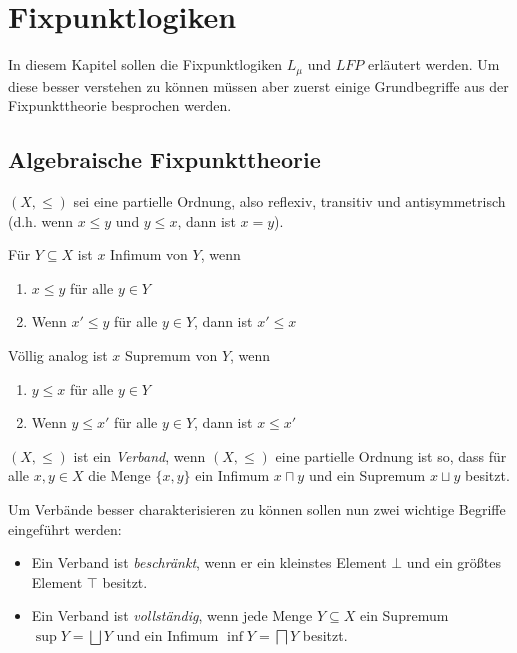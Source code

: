 \section{Fixpunktlogiken}

In diesem Kapitel sollen die Fixpunktlogiken $L_\mu$ und $LFP$ erläutert werden. 
Um diese besser verstehen zu können müssen aber zuerst einige Grundbegriffe aus der Fixpunkttheorie besprochen werden.

\subsection{Algebraische Fixpunkttheorie}

$(X,\leq)$ sei eine partielle Ordnung, also reflexiv, transitiv und antisymmetrisch (d.h. wenn $x\leq y$ und $y\leq x$, dann ist $x=y$).

Für $Y\subseteq X$ ist $x$ Infimum von $Y$, wenn
\begin{enumerate}
	\item $x\leq y$ für alle $y\in Y$
	\item Wenn $x'\leq y$ für alle $y\in Y$, dann ist $x'\leq x$
\end{enumerate}
Völlig analog ist $x$ Supremum von $Y$, wenn
\begin{enumerate}
	\item $y\leq x$ für alle $y\in Y$
	\item Wenn $y\leq x'$ für alle $y\in Y$, dann ist $x\leq x '$
\end{enumerate}

\begin{definition}[Verband]
	$(X,\leq)$ ist ein \textit{Verband}, wenn $(X,\leq)$ eine partielle Ordnung ist so, dass für alle $x,y\in X$ die Menge $\{x,y\}$ ein Infimum $x\sqcap y$ und ein Supremum $x\sqcup y$ besitzt.
\end{definition}

\begin{definition}
	Um Verbände besser charakterisieren zu können sollen nun zwei wichtige Begriffe eingeführt werden:
	
	\begin{itemize}
		\item Ein Verband ist \textit{beschränkt}, wenn er ein kleinstes Element $\bot$ und ein größtes Element $\top$ besitzt.
		\item Ein Verband ist \textit{vollständig}, wenn jede Menge $Y\subseteq X$ ein Supremum $\sup Y=\bigsqcup Y$ und ein Infimum $\inf Y = \bigsqcap Y$ besitzt.
	\end{itemize}
\end{definition}

